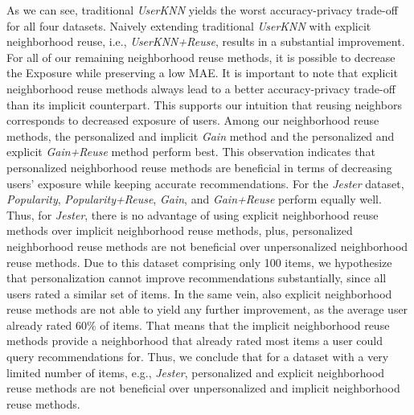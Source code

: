 \documentclass[manuscript,review,anonymous]{acmart}
\begin{document}
As we can see, traditional \emph{UserKNN} yields the worst accuracy-privacy trade-off for all four datasets.
Naively extending traditional \emph{UserKNN} with explicit neighborhood reuse, i.e., \emph{UserKNN+Reuse}, results in a substantial improvement.
For all of our remaining neighborhood reuse methods, it is possible to decrease the Exposure while preserving a low MAE.
It is important to note that explicit neighborhood reuse methods always lead to a better accuracy-privacy trade-off than its implicit counterpart.
This supports our intuition that reusing neighbors corresponds to decreased exposure of users.
Among our neighborhood reuse methods, the personalized and implicit \emph{Gain} method and the personalized and explicit \emph{Gain+Reuse} method perform best.
This observation indicates that personalized neighborhood reuse methods are beneficial in terms of decreasing users' exposure while keeping accurate recommendations.
For the \emph{Jester} dataset, \emph{Popularity}, \emph{Popularity+Reuse}, \emph{Gain}, and \emph{Gain+Reuse} perform equally well.
Thus, for \emph{Jester}, there is no advantage of using explicit neighborhood reuse methods over implicit neighborhood reuse methods, plus, personalized neighborhood reuse methods are not beneficial over unpersonalized neighborhood reuse methods.
Due to this dataset comprising only 100 items, we hypothesize that personalization cannot improve recommendations substantially, since all users rated a similar set of items.
In the same vein, also explicit neighborhood reuse methods are not able to yield any further improvement, as the average user already rated 60\% of items. 
That means that the implicit neighborhood reuse methods provide a neighborhood that already rated most items a user could query recommendations for.
Thus, we conclude that for a dataset with a very limited number of items, e.g., \emph{Jester}, personalized and explicit neighborhood reuse methods are not beneficial over unpersonalized and implicit neighborhood reuse methods.
\end{document}
